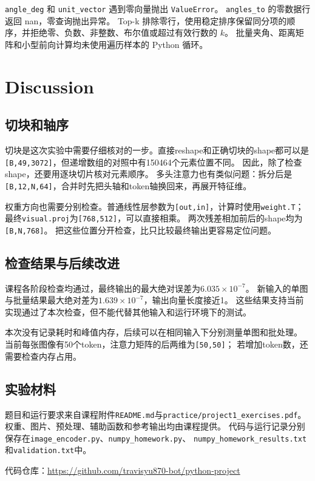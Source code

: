 \documentclass[a4paper,12pt]{article}
\newcommand{\shape}[1]{\texttt{#1}}
\newcommand{\file}[1]{\nolinkurl{#1}}
\begin{document}
\file{angle_deg} 和 \file{unit_vector} 遇到零向量抛出 \file{ValueError}。
\file{angles_to} 的零数据行返回 nan，零查询抛出异常。
Top-k 排除零行，使用稳定排序保留同分项的顺序，并拒绝零、负数、非整数、布尔值或超过有效行数的 $k$。
批量夹角、距离矩阵和小型前向计算均未使用遍历样本的 Python 循环。

\clearpage
\section{Discussion}
\subsection{切块和轴序}
切块是这次实验中需要仔细核对的一步。直接reshape和正确切块的shape都可以是
\shape{[B,49,3072]}，但递增数组的对照中有150464个元素位置不同。
因此，除了检查shape，还要用逐块切片核对元素顺序。
多头注意力也有类似问题：拆分后是\shape{[B,12,N,64]}，合并时先把头轴和token轴换回来，再展开特征维。

权重方向也需要分别检查。普通线性层参数为\shape{[out,in]}，计算时使用\file{weight.T}；
最终\file{visual.proj}为\shape{[768,512]}，可以直接相乘。
两次残差相加前后的shape均为\shape{[B,N,768]}。
把这些位置分开检查，比只比较最终输出更容易定位问题。

\subsection{检查结果与后续改进}
课程各阶段检查均通过，最终输出的最大绝对误差为$6.035\times10^{-7}$。
新输入的单图与批量结果最大绝对差为$1.639\times10^{-7}$，输出向量长度接近1。
这些结果支持当前实现通过了本次检查，但不能代替其他输入和运行环境下的测试。

本次没有记录耗时和峰值内存，后续可以在相同输入下分别测量单图和批处理。
当前每张图像有50个token，注意力矩阵的后两维为\shape{[50,50]}；
若增加token数，还需要检查内存占用。

\subsection{实验材料}
题目和运行要求来自课程附件\file{README.md}与\file{practice/project1_exercises.pdf}。
权重、图片、预处理、辅助函数和参考输出均由课程提供。
代码与运行记录分别保存在\file{image_encoder.py}、\file{numpy_homework.py}、
\file{numpy_homework_results.txt}和\file{validation.txt}中。

\noindent 代码仓库：\url{https://github.com/travisyu870-bot/python-project}
\end{document}
